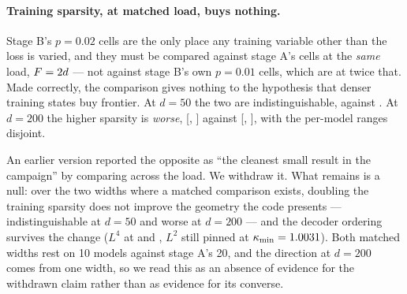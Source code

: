 \paragraph{Training sparsity, at matched load, buys nothing.} Stage B's $p=0.02$ cells are the only
place any training variable other than the loss is varied, and they must be compared against stage
A's cells at the \emph{same} load, $F=\SbLoadMatched d$ --- not against stage B's own $p=0.01$ cells,
which are at twice that. Made correctly, the comparison gives nothing to the hypothesis that denser
training states buy frontier. At $d=50$ the two are indistinguishable, \SbMatchFiftyPoneKappa{}
against \SbMatchFiftyPtwoKappa{}. At $d=200$ the higher sparsity is \emph{worse}, \SbMatchPtwoKappa{}
[\SbMatchPtwoKappaLo, \SbMatchPtwoKappaHi] against \SbMatchPoneKappa{}
[\SbMatchPoneKappaLo, \SbMatchPoneKappaHi], with the per-model ranges disjoint.

An earlier version reported the opposite as ``the cleanest small result in the campaign'' by
comparing across the load. We withdraw it. What remains is a null: over the two widths where a
matched comparison exists, doubling the training sparsity does not improve the geometry the code
presents --- indistinguishable at $d=50$ and worse at $d=200$ --- and the decoder ordering survives
the change ($L^4$ at \SbLoadLfourFiftyDiff{} and \SbLoadLfourTwoHundredDiff{}, $L^2$ still pinned at
$\kappa_{\min}=1.0031$). Both matched widths rest on 10 models against stage A's
20, and the direction at $d=200$ comes from one width, so we read this as an absence of evidence for
the withdrawn claim rather than as evidence for its converse.

\begin{table}[t]
\centering
\caption{Stage B: a separate campaign with its own seeds and run record. The $F/d$ column is the one
to read first. The $p=0.01$ rows are at $F=\SbLoadHigh d$, twice stage A's load; the $p=0.02$ rows
are at $F=\SbLoadMatched d$ and vary the training sparsity instead. ``mean difference'' is network
minus best post-ReLU affine probe in $s_{95}$, paired within seed, and $\kappa_{\min}$ is the exact
minimum over all $F$ features. Any comparison against stage A must hold $F/d$ fixed; doing otherwise
produced a claim we withdraw in Appendix~\ref{app:withdrawn}. Generated from
\texttt{results/e7\_stageB/derived/}.}
\label{tab:stageb}
\small

\end{table}
